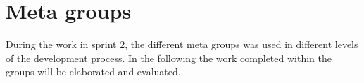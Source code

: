 \section{Meta groups}
During the work in sprint 2, the different meta groups was used in different levels of the development process. 
In the following the work completed within the groups will be elaborated and evaluated.





